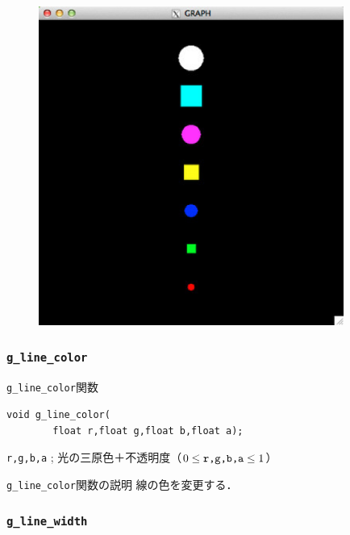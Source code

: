 \documentclass[platex,a4paper,12pt]{jsarticle}%
\begin{document}
\begin{figure}[htb]
\centering
\includegraphics[width=100mm]{./Figures/eps/Canvas_g_marker.eps}
\end{figure}


\clearpage
\subsubsection{\texttt{g\_line\_color}}

\begin{itembox}[l]{\texttt{g\_line\_color}関数}
\begin{verbatim}
void g_line_color(
        float r,float g,float b,float a);
\end{verbatim}
\verb|r,g,b,a| ; 光の三原色＋不透明度（$0\leq \verb|r,g,b,a| \leq 1$）
\end{itembox}

\begin{itembox}[l]{\texttt{g\_line\_color}関数の説明}
線の色を変更する．
\end{itembox}

\subsubsection{\texttt{g\_line\_width}}
\end{document}
